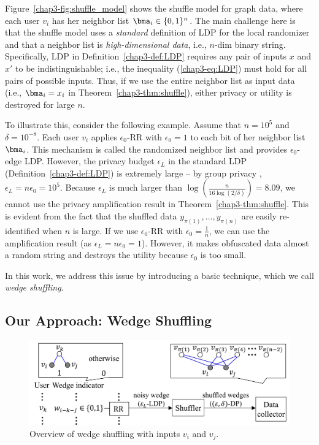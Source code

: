 Figure~\ref{chap3-fig:shuffle_model} shows the shuffle model for graph data, where each user $v_i$ has her neighbor list $\bma_i \in \{0,1\}^n$. 
The main challenge here 
is that 
the shuffle model uses a \textit{standard} definition of LDP for the local randomizer and that a neighbor list is \textit{high-dimensional data}, i.e., $n$-dim binary string. 
Specifically, LDP in Definition~\ref{chap3-def:LDP} requires any pair of inputs $x$ and $x'$ to be indistinguishable; i.e., 
the inequality (\ref{chap3-eq:LDP}) must hold for all pairs of possible inputs. 
Thus, if we use the entire neighbor list 
as input data (i.e., $\bma_i = x_i$ in Theorem~\ref{chap3-thm:shuffle}), 
either privacy or utility is destroyed for large $n$. 

To illustrate this, consider the following example. 
Assume that $n=10^5$ and $\delta=10^{-8}$. 
Each user $v_i$ applies 
$\epsilon_0$-RR 
with $\epsilon_0=1$ to each bit of her neighbor list $\bma_i$. 
This mechanism is called the randomized neighbor list \cite{Qin_CCS17} and provides $\epsilon_0$-edge LDP. 
However, the privacy budget $\epsilon_L$ in the standard LDP (Definition~\ref{chap3-def:LDP}) 
is extremely large -- by group privacy \cite{DP}, $\epsilon_L = n \epsilon_0 = 10^5$. 
Because 
$\epsilon_L$ 
is much larger than $\log (\frac{n}{16 \log (2/\delta)}) = 8.09$, we cannot use the privacy amplification result in Theorem~\ref{chap3-thm:shuffle}. 
This is evident from the fact that the shuffled data $y_{\pi(1)}, \ldots, y_{\pi(n)}$ are easily re-identified when $n$ is large. 
If we use 
$\epsilon_0$-RR 
with $\epsilon_0 = \frac{1}{n}$, we can use the amplification result (as $\epsilon_L = n \epsilon_0 = 1$). 
However, it makes obfuscated data almost a random string and destroys the utility because $\epsilon_0$ is too small. 

In this work, we address this issue by introducing a basic technique, which we call \textit{wedge shuffling}. 

\subsection{Our Approach: Wedge Shuffling}
\label{chap3-sub:wedge_shuffle}

\begin{figure}[t]
  \centering
  \includegraphics[width=0.99\linewidth]{fig/wedge_shuffle.pdf}
  
  \caption{Overview of wedge shuffling with inputs $v_i$ and $v_j$. 
  }
  \label{chap3-fig:wedge_shuffle}
\end{figure}


